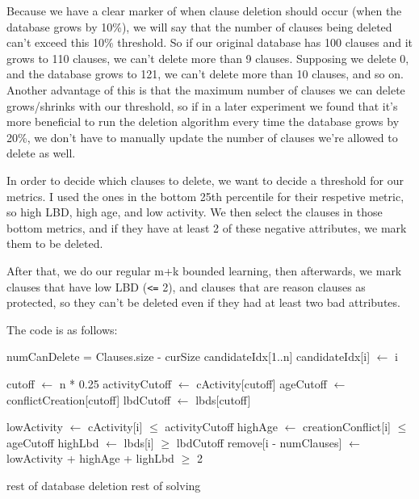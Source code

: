 Because we have a clear marker of when clause deletion should occur (when the database 
grows by 10\%), we will say that the number of clauses being deleted can't exceed this 
10\% threshold. So if our original database has 100 clauses and it grows to 110 clauses,
we can't delete more than 9 clauses. Supposing we delete 0, and the database grows to 
121, we can't delete more than 10 clauses, and so on. Another advantage of this is 
that the maximum number of clauses we can delete grows/shrinks with our threshold, so 
if in a later experiment we found that it's more beneficial to run the deletion algorithm 
every time the database grows by 20\%, we don't have to manually update the number of 
clauses we're allowed to delete as well.

In order to decide which clauses to delete, we want to decide a threshold for our 
metrics. I used the ones in the bottom 25th percentile for their respetive metric, 
so high LBD, high age, and low activity. We then select the clauses in those 
bottom metrics, and if they have at least 2 of these negative attributes, we mark 
them to be deleted. 

After that, we do our regular m+k bounded learning, then afterwards, we mark clauses 
that have low LBD (\verb|<=| 2), and clauses that are reason clauses as protected, 
so they can't be deleted even if they had at least two bad attributes.

The code is as follows:

\begin{algorithm}[H]
\caption{M+K-Bounded Learning Solver}\label{alg:47}
\begin{algorithmic}[1]

\State {}

        \State numCanDelete = Clauses.size - curSize
        \State candidateIdx[1..n]
            \State candidateIdx[i] $\gets$ i
        \EndFor

        \State cutoff $\gets$ n * 0.25
        \State {}
        \State activityCutoff $\gets$ cActivity[cutoff]
        \State {}
        \State ageCutoff $\gets$ conflictCreation[cutoff]
        \State {}
        \State lbdCutoff $\gets$ lbds[cutoff]

            \State lowActivity $\gets$ cActivity[i] $\le$ activityCutoff
            \State highAge $\gets$ creationConflict[i] $\le$ ageCutoff
            \State highLbd $\gets$ lbds[i] $\ge$ lbdCutoff
            \State remove[i - numClauses] $\gets$ lowActivity + highAge + lighLbd $\ge$ 2 
        \EndFor

        \State rest of database deletion
    \EndIf
    \State rest of solving
\EndWhile

\EndProcedure
\end{algorithmic}
\end{algorithm}

